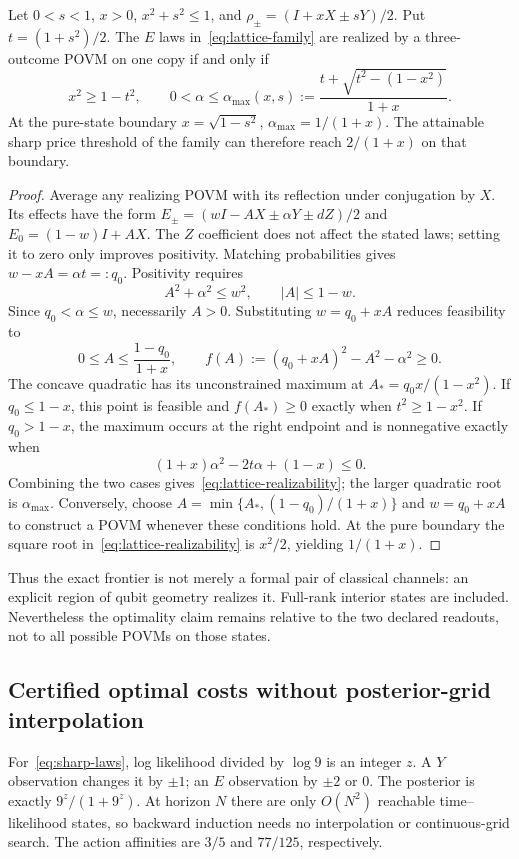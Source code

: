 \begin{proposition}
\label{prop:lattice-realizability}
Let $0<s<1$, $x>0$, $x^2+s^2\leq1$, and
$\rho_\pm=(I+xX\pm sY)/2$. Put $t=(1+s^2)/2$.
The $E$ laws in~\eqref{eq:lattice-family} are realized by a three-outcome
POVM on one copy if and only if
\begin{equation}\label{eq:lattice-realizability}
 x^2\geq1-t^2,\qquad
 0<\alpha\leq
 \alpha_{\max}(x,s):=
 \frac{t+\sqrt{t^2-(1-x^2)}}{1+x}.
\end{equation}
At the pure-state boundary $x=\sqrt{1-s^2}$,
$\alpha_{\max}=1/(1+x)$. The attainable sharp price threshold of the
family can therefore reach $2/(1+x)$ on that boundary.
\end{proposition}
\begin{proof}
Average any realizing POVM with its reflection under conjugation by $X$.
Its effects have the form
$E_\pm=(wI-AX\pm\alpha Y\pm dZ)/2$ and
$E_0=(1-w)I+AX$. The $Z$ coefficient does not affect the stated laws;
setting it to zero only improves positivity. Matching probabilities gives
$w-xA=\alpha t=:q_0$. Positivity requires
\[
 A^2+\alpha^2\leq w^2,\qquad |A|\leq1-w.
\]
Since $q_0<\alpha\leq w$, necessarily $A>0$.
Substituting $w=q_0+xA$ reduces feasibility to
\[
 0\leq A\leq\frac{1-q_0}{1+x},\qquad
 f(A):=(q_0+xA)^2-A^2-\alpha^2\geq0.
\]
The concave quadratic has its unconstrained maximum at
$A_*=q_0x/(1-x^2)$. If $q_0\leq1-x$, this point is feasible and
$f(A_*)\geq0$ exactly when $t^2\geq1-x^2$.
If $q_0>1-x$, the maximum occurs at the right endpoint and is
nonnegative exactly when
\[
 (1+x)\alpha^2-2t\alpha+(1-x)\leq0.
\]
Combining the two cases gives~\eqref{eq:lattice-realizability}; the
larger quadratic root is $\alpha_{\max}$. Conversely, choose
$A=\min\{A_*,(1-q_0)/(1+x)\}$ and $w=q_0+xA$ to construct a POVM
whenever these conditions hold. At the pure boundary the square root
in~\eqref{eq:lattice-realizability} is $x^2/2$, yielding $1/(1+x)$.
\end{proof}
Thus the exact frontier is not merely a formal pair of classical channels:
an explicit region of qubit geometry realizes it. Full-rank interior
states are included. Nevertheless the optimality claim remains relative
to the two declared readouts, not to all possible POVMs on those states.

\subsection{Certified optimal costs without posterior-grid interpolation}
\label{sec:sharp-certificates}
For~\eqref{eq:sharp-laws}, log likelihood divided by $\log9$ is an integer
$z$. A $Y$ observation changes it by $\pm1$; an $E$ observation by
$\pm2$ or $0$. The posterior is exactly $9^z/(1+9^z)$.
At horizon $N$ there are only $O(N^2)$ reachable time--likelihood states,
so backward induction needs no interpolation or continuous-grid search.
The action affinities are $3/5$ and $77/125$, respectively.

